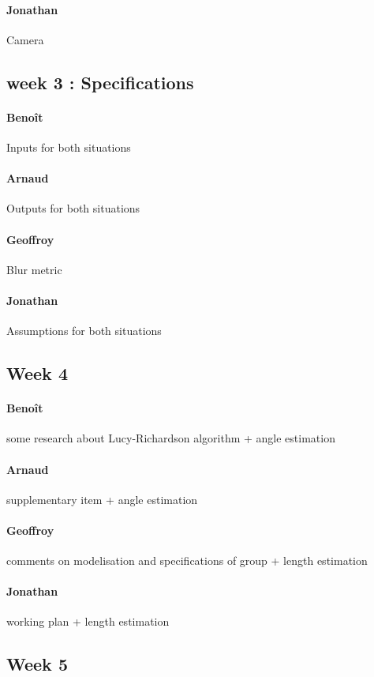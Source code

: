\paragraph{Jonathan} Camera

\subsection*{week 3 : Specifications}
\paragraph{Benoît} Inputs for both situations
\paragraph{Arnaud} Outputs for both situations
\paragraph{Geoffroy} Blur metric
\paragraph{Jonathan} Assumptions for both situations

\subsection*{Week 4}
\paragraph{Benoît} some research about Lucy-Richardson algorithm + angle estimation
\paragraph{Arnaud} supplementary item + angle estimation
\paragraph{Geoffroy} comments on modelisation and specifications of group + length estimation
\paragraph{Jonathan} working plan + length estimation

\subsection*{Week 5}
